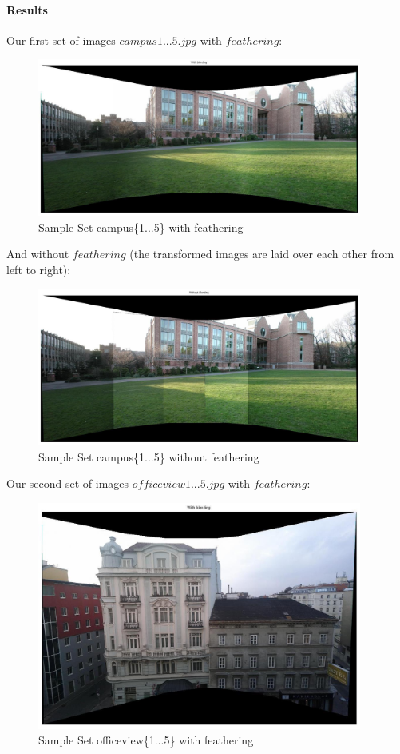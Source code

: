 \documentclass[subfigure,epsfig,fleqn,float,numbers=noenddot]{scrartcl}
\begin{document}
\paragraph{Results}
Our first set of images $campus1...5.jpg$ with $feathering$:
\begin{figure}[H]
		\centering
		\includegraphics[width=0.95\textwidth]{./img/withBlending.jpg}
		\caption{Sample Set campus\{1...5\} with feathering}
		\label{img:withBlend}
\end{figure}
And without $feathering$ (the transformed images are laid over each other from left to right):
\begin{figure}[H]
		\centering
		\includegraphics[width=0.95\textwidth]{./img/withoutBlending.jpg}
		\caption{Sample Set campus\{1...5\} without feathering}
		\label{img:withoutBlend}
\end{figure} 
Our second set of images $officeview1...5.jpg$ with $feathering$:
\begin{figure}[H]
		\centering
		\includegraphics[width=0.95\textwidth]{./img/withBlending2.jpg}
		\caption{Sample Set officeview\{1...5\} with feathering}
		\label{img:withBlend2}
\end{figure}
\end{document}
